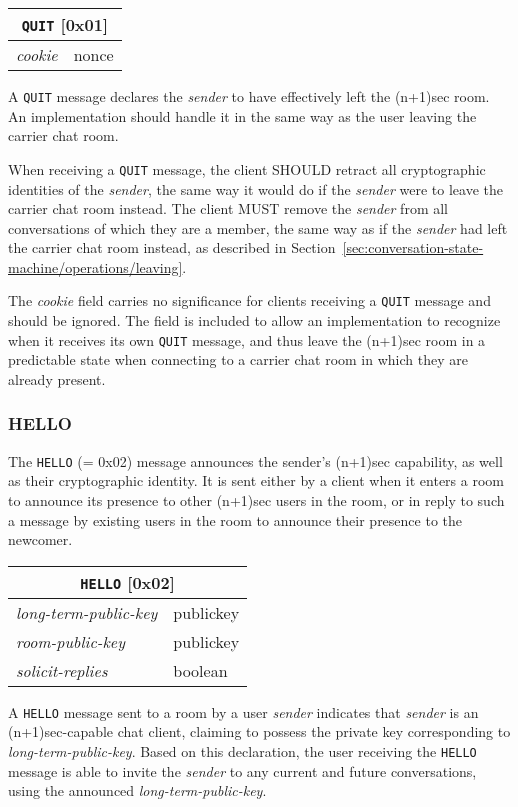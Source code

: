 \documentclass{article}
\def\message#1{\texttt{#1}}
\def\field#1{\textit{#1}}
\def\type#1{\textsf{#1}}
\newenvironment{basicmessage}[2]{
\newcommand{\messagefield}[2]{
\field{##1} & \type{##2} \\
\hline
}
\hspace{2em minus 2em}\begin{tabular}{|l|l|}
\hline
\multicolumn{2}{|c|}{\message{#1} [#2]} \\
\hline
\hline
}{
\end{tabular}
}
\begin{document}
\begin{basicmessage}{QUIT}{0x01}
\messagefield{cookie}{nonce}
\end{basicmessage}

A \message{QUIT} message declares the \field{sender} to have effectively left the (n+1)sec room.
An implementation should handle it in the same way as the user leaving the carrier chat room.

When receiving a \message{QUIT} message, the client SHOULD retract all cryptographic identities of the \field{sender}, the same way it would do if the \field{sender} were to leave the carrier chat room instead.
The client MUST remove the \field{sender} from all conversations of which they are a member, the same way as if the \field{sender} had left the carrier chat room instead, as described in Section~\ref{sec:conversation-state-machine/operations/leaving}.

The \field{cookie} field carries no significance for clients receiving a \message{QUIT} message and should be ignored.
The field is included to allow an implementation to recognize when it receives its own \message{QUIT} message, and thus leave the (n+1)sec room in a predictable state when connecting to a carrier chat room in which they are already present.


\subsubsection{HELLO}
\label{sec:messages/hello}

The \message{HELLO} (= 0x02) message announces the sender's (n+1)sec capability, as well as their cryptographic identity.
It is sent either by a client when it enters a room to announce its presence to other (n+1)sec users in the room, or in reply to such a message by existing users in the room to announce their presence to the newcomer.

\begin{basicmessage}{HELLO}{0x02}
\messagefield{long-term-public-key}{publickey}
\messagefield{room-public-key}{publickey}
\messagefield{solicit-replies}{boolean}
\end{basicmessage}

A \message{HELLO} message sent to a room by a user \field{sender} indicates that \field{sender} is an (n+1)sec-capable chat client, claiming to possess the private key corresponding to \field{long-term-public-key}.
Based on this declaration, the user receiving the \message{HELLO} message is able to invite the \field{sender} to any current and future conversations, using the announced \field{long-term-public-key}.
\end{document}
